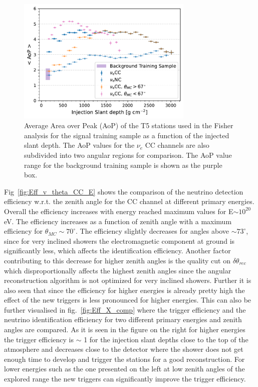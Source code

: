 \begin{figure}[t!]
  \centering
  \includegraphics[width=0.75\textwidth]{thesis_figures/Nu_analysis/Nu_eff/Selection_Evo_AoP_X_MC_wnt_redcut.pdf}
  \caption{Average Area over Peak (AoP) of the T5 stations used in the Fisher analysis for the signal training sample as a function of the injected slant depth. The AoP values for the $\nu_e$ CC channels are also subdivided into two angular regions for comparison. The AoP value range for the background training sample is shown as the purple box.}
  \label{fig:AoP_v_X}
\end{figure}

Fig~\ref{fig:Eff_v_theta_CC_E} shows the comparison of the neutrino detection efficiency w.r.t. the zenith angle for the CC channel at different primary energies. Overall the efficiency increases with energy reached maximum values for E$\sim 10^{20}$eV. The efficiency increases as a function of zenith angle with a maximum efficiency for $\theta_{MC} \sim 70^{\circ}$. The efficiency slightly decreases for angles above $ \sim 73^{\circ}$, since for very inclined showers the electromagnetic component at ground is significantly less, which affects the identification efficiency. Another factor contributing to this decrease for higher zenith angles is the quality cut on $\delta \theta_{rec}$ which disproportionally affects the highest zenith angles since the angular reconstruction algorithm is not optimized for very inclined showers. Further it is also seen that since the efficiency for higher energies is already pretty high the effect of the new triggers is less pronounced for higher energies. This can also be further visualised in fig.~\ref{fig:Eff_X_comp} where the trigger efficiency and the neutrino identification efficiency for two different primary energies and zenith angles are compared. As it is seen in the figure on the right for higher energies the trigger efficiency is $\sim$ 1 for the injection slant depths close to the top of the atmosphere and decreases close to the detector where the shower does not get enough time to develop and trigger the stations for a good reconstruction. For lower energies  such as the one presented on the left at low zenith angles of the explored range the new triggers can significantly improve the trigger efficiency. 

